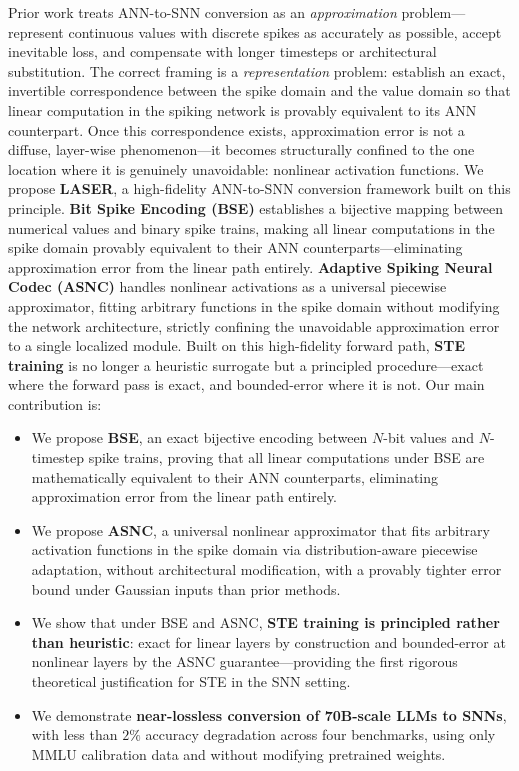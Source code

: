 \documentclass{article}
\theoremstyle{plain}
\theoremstyle{definition}
\theoremstyle{remark}
\begin{document}
Prior work treats ANN-to-SNN conversion as an \emph{approximation} problem---represent
continuous values with discrete spikes as accurately as possible, accept inevitable loss, and compensate with longer timesteps or architectural substitution. The correct framing is a \emph{representation} problem: establish an exact, invertible correspondence between the spike domain and the value domain so that linear computation in the spiking network is provably equivalent to its ANN counterpart. Once this correspondence exists, approximation error is not a diffuse, layer-wise phenomenon---it becomes structurally confined to the one location where it is genuinely unavoidable: nonlinear activation functions.
%
We propose \textbf{LASER}, a high-fidelity ANN-to-SNN conversion framework built on
this principle. \textbf{Bit Spike Encoding (BSE)} establishes a bijective mapping
between numerical values and binary spike trains, making all linear computations in
the spike domain provably equivalent to their ANN counterparts---eliminating
approximation error from the linear path entirely. \textbf{Adaptive Spiking Neural
Codec (ASNC)} handles nonlinear activations as a universal piecewise approximator,
fitting arbitrary functions in the spike domain without modifying the network
architecture, strictly confining the unavoidable approximation error to a single
localized module. Built on this high-fidelity forward path, \textbf{STE training}
is no longer a heuristic surrogate but a principled procedure---exact where the
forward pass is exact, and bounded-error where it is not. Our main contribution is:
\begin{itemize}
  \item We propose \textbf{BSE}, an exact bijective encoding between $N$-bit values and $N$-timestep spike trains, proving that all linear computations under BSE are mathematically equivalent to their ANN counterparts, eliminating approximation error from the linear path entirely.

  \item We propose \textbf{ASNC}, a universal nonlinear approximator that fits arbitrary activation functions in the spike domain via distribution-aware piecewise adaptation, without architectural modification, with a provably tighter error bound under Gaussian inputs than prior methods.

  \item We show that under BSE and ASNC, \textbf{STE training is principled rather than heuristic}: exact for linear layers by construction and bounded-error at nonlinear layers by the ASNC guarantee—providing the first rigorous theoretical justification for STE in the SNN setting.

  \item We demonstrate \textbf{near-lossless conversion of 70B-scale LLMs to SNNs}, with less than $2\%$ accuracy degradation across four benchmarks, using only MMLU calibration data and without modifying pretrained weights.
\end{itemize}
\end{document}
